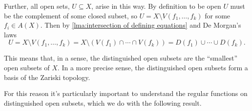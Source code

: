 \documentclass[fleqn]{NotesClass}
\begin{document}
    Further, all open sets, \(U \subseteq X\), arise in this way.
    By definition to be open \(U\) must be the complement of some closed subset, so \(U = X \setminus V(f_1, \dotsc, f_k)\) for some \(f_i \in A(X)\).
    Then by \cref{lma:intersection of defining equations} and De Morgan's laws
    \begin{equation}
        U = X \setminus V(f_1, \dotsc, f_k) = X \setminus (V(f_1) \cap \dotsb \cap V(f_k)) = D(f_1) \cup \dotsb \cup D(f_k).
    \end{equation}
    
    This means that, in a sense, the distinguished open subsets are the \enquote{smallest} open subsets of \(X\).
    In a more precise sense, the distinguished open subsets form a basis of the Zariski topology.
    
    For this reason it's particularly important to understand the regular functions on distinguished open subsets, which we do with the following result.
    
\end{document}
